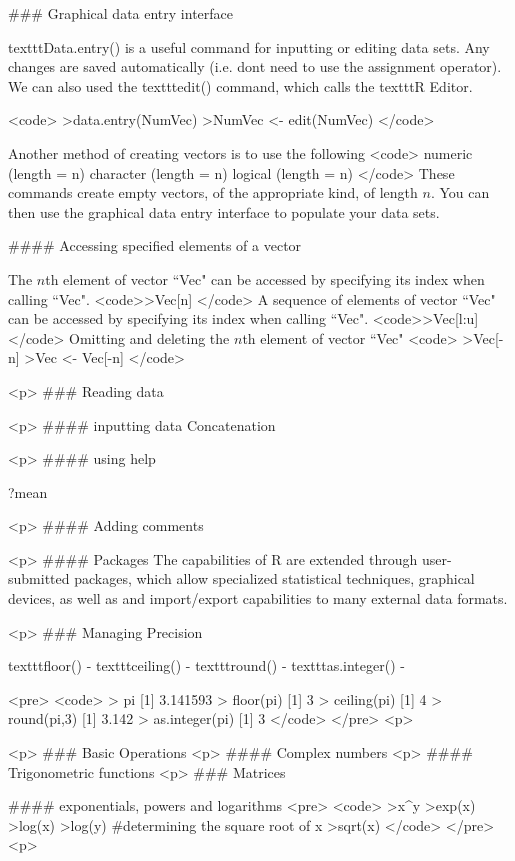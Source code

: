 ### {Graphical data entry interface}

texttt{Data.entry()} is a useful  command for inputting or editing data sets. Any
changes are saved automatically (i.e. dont need to use the assignment
operator). We can also used the texttt{edit()} command, which calls the texttt{R Editor}.

<code>
>data.entry(NumVec)
>NumVec <- edit(NumVec)
</code>

Another method of creating vectors is to use the following
<code>
numeric (length = n)
character (length = n)
logical (length = n)
</code>
These commands create empty vectors, of the appropriate kind, of length $n$. You can then use the graphical data entry interface to populate your data sets.


#### {Accessing specified elements of a vector}

The $n$th element of vector ``Vec" can be accessed by specifying its index when
calling ``Vec".
<code>>Vec[n]
</code>
A sequence of  elements of vector ``Vec" can be accessed by specifying its index
when calling ``Vec".
<code>>Vec[l:u]
</code>
Omitting and deleting the $n$th element of vector ``Vec"
<code>
>Vec[-n]
>Vec <- Vec[-n]
</code>

<p>
### {Reading data}


<p>
#### {inputting data}
 Concatenation

<p>
#### {using help}

?mean

<p>
#### {Adding comments}

<p>
#### {Packages}
The capabilities of R are extended through user-submitted packages, which allow specialized statistical techniques, graphical devices, as well as and
import/export capabilities to many external data formats.

<p>
### {Managing Precision}

texttt{floor()} - 
texttt{ceiling()} - 
texttt{round()} - 
texttt{as.integer()} -


<pre>
<code>
> pi
[1] 3.141593
> floor(pi)
[1] 3
> ceiling(pi)
[1] 4
> round(pi,3)
[1] 3.142
> as.integer(pi)
[1] 3
</code>
</pre>
<p>

<p>
### {Basic Operations}
<p>
#### {Complex numbers}
<p>
#### {Trigonometric functions}
<p>
### {Matrices}




#### {exponentials, powers and logarithms}
<pre>
<code>
>x^y
>exp(x)
>log(x)
>log(y)
#determining the square root of x
>sqrt(x)
</code>
</pre>
<p>

